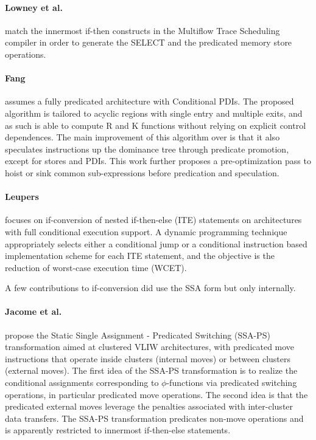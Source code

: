 \paragraph{Lowney et al. \cite{Lowney:1993:JS}} match the innermost if-then
constructs in the Multiflow Trace Scheduling compiler in order to generate the
SELECT and the predicated memory store operations.

\paragraph{Fang \cite{Fang:1996:LCPC}} assumes a fully predicated architecture with
Conditional PDIs. The proposed algorithm is tailored to acyclic regions with
single entry and multiple exits, and as such is able to compute R and K
functions without relying on explicit control dependences.  The main improvement
of this algorithm over \cite{Park:1991:TR58} is that it also speculates
instructions up the dominance tree through predicate promotion, except for
stores and PDIs. This work further proposes a pre-optimization pass to hoist or
sink common sub-expressions before predication and speculation.

\paragraph{Leupers \cite{Leupers:1999:DATE}} focuses on if-conversion of nested
if-then-else (ITE) statements on architectures with full conditional execution
support. A dynamic programming technique appropriately selects either a
conditional jump or a conditional instruction based implementation scheme for
each ITE statement, and the objective is the reduction of worst-case execution
time (WCET).

\medskip
A few contributions to if-conversion did use the SSA form
but only internally.

\paragraph{Jacome et al. \cite{Jacome:2001:DAC}} propose the Static Single
Assignment - Predicated Switching (SSA-PS) transformation aimed at clustered
VLIW architectures, with predicated move instructions that operate inside
clusters (internal moves) or between clusters (external moves). The first idea
of the SSA-PS transformation is to realize the conditional assignments
corresponding to $\phi$-functions via predicated switching operations, in
particular predicated move operations. The second idea is that the predicated
external moves leverage the penalties associated with inter-cluster data
transfers. The SSA-PS transformation predicates non-move operations and is
apparently restricted to innermost if-then-else statements.

